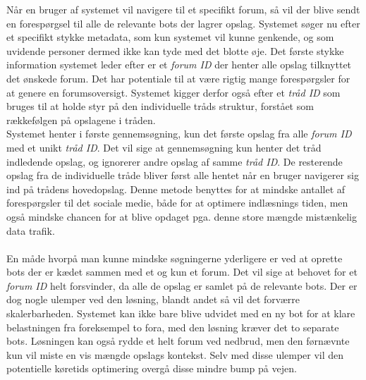 Når en bruger af systemet vil navigere til et specifikt forum, så vil der blive sendt en forespørgsel til alle de relevante bots der lagrer opslag. Systemet søger nu efter et specifikt stykke metadata, som kun systemet vil kunne genkende, og som uvidende personer dermed ikke kan tyde med det blotte øje. Det første stykke information systemet leder efter er et \textit{forum ID} der henter alle opslag tilknyttet det ønskede forum. Det har potentiale til at være rigtig mange forespørgsler for at genere en forumsoversigt. Systemet kigger derfor også efter et \textit{tråd ID} som bruges til at holde styr på den individuelle tråds struktur, forstået som rækkefølgen på opslagene i tråden.\\
Systemet henter i første gennemsøgning, kun det første opslag fra alle \textit{forum ID} med et unikt \textit{tråd ID}. Det vil sige at gennemsøgning kun henter det tråd indledende opslag, og ignorerer andre opslag af samme \textit{tråd ID}. De resterende opslag fra de individuelle tråde bliver først alle hentet når en bruger navigerer sig ind på trådens hovedopslag. Denne metode benyttes for at mindske antallet af forespørgsler til det sociale medie, både for at optimere indlæsnings tiden, men også mindske chancen for at blive opdaget pga. denne store mængde mistænkelig data trafik.\\\\ %
En måde hvorpå man kunne mindske søgningerne yderligere er ved at oprette bots der er kædet sammen med et og kun et forum. Det vil sige at behovet for et \textit{forum ID} helt forsvinder, da alle de opslag er samlet på de relevante bots. Der er dog nogle ulemper ved den løsning, blandt andet så vil det forværre skalerbarheden. Systemet kan ikke bare blive udvidet med en ny bot for at klare belastningen fra foreksempel to fora, med den løsning kræver det to separate bots. Løsningen kan også rydde et helt forum ved nedbrud, men den førnævnte kun vil miste en vis mængde opslags kontekst. Selv med disse ulemper vil den potentielle køretids optimering overgå disse mindre bump på vejen.

